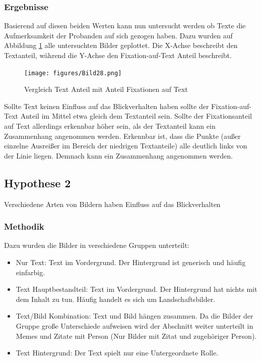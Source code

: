 \documentclass[
    language=german, %
    thesis=seminar, %
    supervisor=postdoc, %
    multiauthor=true, %
    ]{settings/csssa-thesis}
\begin{document}
\subsubsection{Ergebnisse}
Basierend auf diesen beiden Werten kann nun untersucht werden ob Texte die Aufmerksamkeit 
der Probanden auf sich gezogen haben. Dazu wurden auf Abbildung \ref{fig:bild23} alle untersuchten Bilder geplottet. 
Die X-Achse beschreibt den Textanteil, während die Y-Achse den Fixation-auf-Text Anteil beschreibt. 

\begin{figure}[h]
    \centering
    \texttt{[image: figures/Bild28.png]}
    \caption{Vergleich Text Anteil mit Anteil Fixationen auf Text}\label{fig:bild23}
\end{figure}

Sollte Text keinen Einfluss auf das Blickverhalten haben sollte der Fixation-auf-Text Anteil im Mittel 
etwa gleich dem Textanteil sein. Sollte der Fixationsanteil auf Text allerdings erkennbar höher sein, 
als der Textanteil kann ein Zusammenhang angenommen werden.
Erkennbar ist, dass die Punkte (au{\ss}er einzelne Ausrei{\ss}er im Bereich der niedrigen Textanteile) 
alle deutlich links von der Linie liegen. Demnach kann ein Zusammenhang angenommen werden.

\subsection{Hypothese 2}
Verschiedene Arten von Bildern haben Einfluss auf das Blickverhalten

\subsubsection{Methodik}
Dazu wurden die Bilder in verschiedene Gruppen unterteilt:
\begin{itemize}
    \item Nur Text: Text im Vordergrund. Der Hintergrund ist generisch und häufig einfarbig. 
    \item Text Hauptbestandteil: Text im Vordergrund. Der Hintergrund hat nichts mit dem Inhalt zu tun. Häufig handelt es sich um Landschaftsbilder. 
    \item Text/Bild Kombination: Text und Bild hängen zusammen. Da die Bilder der Gruppe gro{\ss}e Unterschiede aufweisen wird der Abschnitt weiter unterteilt in Memes und Zitate mit Person (Nur Bilder mit Zitat und zugehöriger Person).
    \item Text Hintergrund: Der Text spielt nur eine Untergeordnete Rolle. 
\end{itemize}
\end{document}
